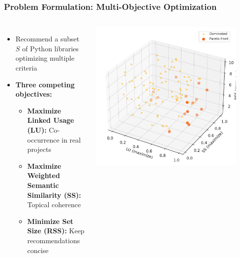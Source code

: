 \documentclass{beamer}
\begin{document}
\begin{frame}
\frametitle{Problem Formulation: Multi-Objective Optimization}

\begin{columns}[T]
\begin{itemize}
\item Recommend a subset $S$ of Python libraries optimizing multiple criteria
\item \textbf{Three competing objectives:}
  \begin{itemize}
  \item \textbf{Maximize Linked Usage (LU):} Co-occurrence in real projects
  \item \textbf{Maximize Weighted Semantic Similarity (SS):} Topical coherence 
  \item \textbf{Minimize Set Size (RSS):} Keep recommendations concise
  \end{itemize}
\end{itemize}

\begin{center}
\includegraphics[width=0.9\textwidth]{Imagens/Non-Dominated_Solutions.png}
\end{center}
\end{columns}
\end{frame}
\end{document}

